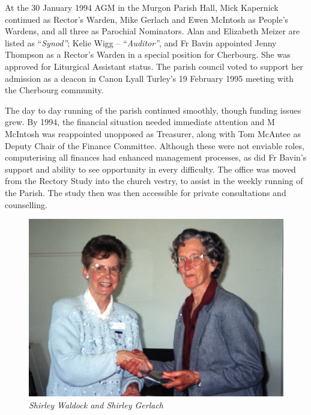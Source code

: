 At the 30 January 1994 AGM in the Murgon Parish Hall, Mick Kapernick continued as Rector's Warden, Mike Gerlach and Ewen McIntosh as People's Wardens, and all three as Parochial Nominators. Alan and Elizabeth Meizer are listed as ``\emph{Synod''}; Kelie Wigg -- ``\emph{Auditor''}, and Fr Bavin appointed Jenny Thompson as a Rector's Warden in a special position for Cherbourg. She was approved for Liturgical Assistant status. The parish council voted to support her admission as a deacon in Canon Lyall Turley's 19 February 1995 meeting with the Cherbourg community.



The day to day running of the parish continued smoothly, though funding issues grew. By 1994, the financial situation needed immediate attention and M McIntosh was reappointed unopposed as Treasurer, along with Tom McAntee as Deputy Chair of the Finance Committee. Although these were not enviable roles, computerising all finances had enhanced management processes, as did Fr Bavin's support and ability to see opportunity in every difficulty. The office was moved from the Rectory Study into the church vestry, to assist in the weekly running of the Parish. The study then was then accessible for private consultations and counselling.









\begin{figure}
\begin{center}
\includegraphics[width=1.\linewidth,center]{../images/waldockGerlach.jpg}
\caption{\itshape Shirley Waldock and Shirley Gerlach}
\end{center}
\end{figure}




